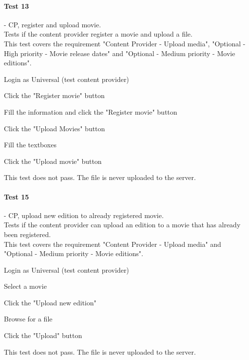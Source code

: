 \paragraph{Test 13} - CP, register and upload movie. \\
Tests if the content provider register a movie and upload a file. \\
This test covers the requirement "Content Provider - Upload media", "Optional - High priority - Movie release dates" and "Optional - Medium priority - Movie editions".
\begin{my_enumerate}
\item Login as Universal (test content provider)
\item Click the "Register movie" button
\item Fill the information and click the "Register movie" button
\item Click the "Upload Movies" button
\item Fill the textboxes
\item Click the "Upload movie" button
\end{my_enumerate}
This test does not pass. The file is never uploaded to the server.

\paragraph{Test 15} - CP, upload new edition to already registered movie. \\
Tests if the content provider can upload an edition to a movie that has already been registered. \\
This test covers the requirement "Content Provider - Upload media" and "Optional - Medium priority - Movie editions".
\begin{my_enumerate}
\item Login as Universal (test content provider)
\item Select a movie
\item Click the "Upload new edition"
\item Browse for a file
\item Click the "Upload" button
\end{my_enumerate}
This test does not pass. The file is never uploaded to the server.

